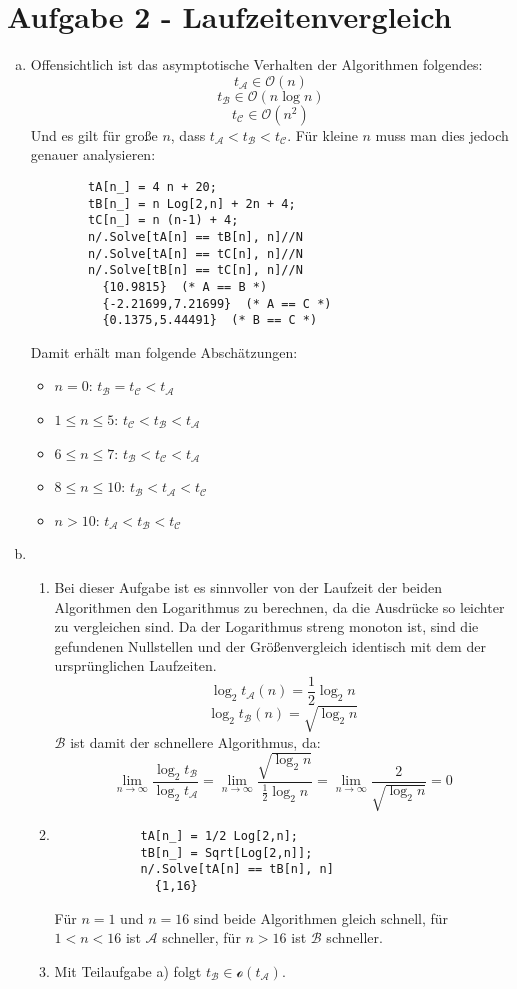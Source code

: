 \section*{Aufgabe 2 - Laufzeitenvergleich}
\begin{enumerate}[a)]
\item
	Offensichtlich ist das asymptotische Verhalten der Algorithmen folgendes:
	\[ t_\mathcal{A} \in \mathcal{O}(n) \]
	\[ t_\mathcal{B} \in \mathcal{O}(n \log n) \]
	\[ t_\mathcal{C} \in \mathcal{O}(n^2) \]
	Und es gilt für große $n$, dass $t_\mathcal{A} < t_\mathcal{B} < t_\mathcal{C}$.
	Für kleine $n$ muss man dies jedoch genauer analysieren:
	\lstset{language=Mathematica}
	\begin{lstlisting}
		tA[n_] = 4 n + 20;
		tB[n_] = n Log[2,n] + 2n + 4;
		tC[n_] = n (n-1) + 4;
		n/.Solve[tA[n] == tB[n], n]//N
		n/.Solve[tA[n] == tC[n], n]//N
		n/.Solve[tB[n] == tC[n], n]//N
		  {10.9815}  (* A == B *)
		  {-2.21699,7.21699}  (* A == C *)
		  {0.1375,5.44491}  (* B == C *)
	\end{lstlisting}
	Damit erhält man folgende Abschätzungen:
	\begin{itemize}
		\item $n=0$: $t_\mathcal{B} = t_\mathcal{C} < t_\mathcal{A}$
		\item $1 \leq n \leq 5$: $t_\mathcal{C} < t_\mathcal{B} < t_\mathcal{A}$
		\item $6 \leq n \leq 7$: $t_\mathcal{B} < t_\mathcal{C} < t_\mathcal{A}$
		\item $8 \leq n \leq 10$: $t_\mathcal{B} < t_\mathcal{A} < t_\mathcal{C}$
		\item $n > 10$: $t_\mathcal{A} < t_\mathcal{B} < t_\mathcal{C}$
	\end{itemize}

\item 
	\begin{enumerate}[1.]
	\item
		Bei dieser Aufgabe ist es sinnvoller von der Laufzeit der beiden Algorithmen den Logarithmus zu berechnen,
		da die Ausdrücke so leichter zu vergleichen sind. Da der Logarithmus streng monoton ist,
		sind die gefundenen Nullstellen und der Größenvergleich identisch mit dem der ursprünglichen Laufzeiten.
		\[ \log_2 t_\mathcal{A}(n) = \frac{1}{2} \log_2 n \]
		\[ \log_2 t_\mathcal{B}(n) = \sqrt{\log_2 n} \]
		$\mathcal{B}$ ist damit der schnellere Algorithmus, da:
		\[ \lim_{n \rightarrow \infty} \frac{\log_2 t_\mathcal{B}}{\log_2 t_\mathcal{A}} = 
		   \lim_{n \rightarrow \infty} \frac{\sqrt{\log_2 n}}{\frac{1}{2} \log_2 n} =
		   \lim_{n \rightarrow \infty} \frac{2}{\sqrt{\log_2 n}} = 0 \]
	\item
		\begin{lstlisting}
			tA[n_] = 1/2 Log[2,n];
			tB[n_] = Sqrt[Log[2,n]];
			n/.Solve[tA[n] == tB[n], n]
			  {1,16}
		\end{lstlisting}
		Für $n=1$ und $n=16$ sind beide Algorithmen gleich schnell, für $1 < n < 16$ ist $\mathcal{A}$ schneller,
		für $n > 16$ ist $\mathcal{B}$ schneller.
	
	\item
		Mit Teilaufgabe a) folgt $t_\mathcal{B} \in \mathcal{o}(t_\mathcal{A})$.
	\end{enumerate}
\end{enumerate}
